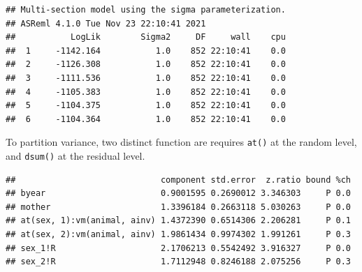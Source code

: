 \documentclass[
  12pt,
]{book}
\newenvironment{Shaded}{\begin{snugshade}}{\end{snugshade}}
\newcommand{\DataTypeTok}[1]{\textcolor[rgb]{0.13,0.29,0.53}{#1}}
\newcommand{\DecValTok}[1]{\textcolor[rgb]{0.00,0.00,0.81}{#1}}
\newcommand{\KeywordTok}[1]{\textcolor[rgb]{0.13,0.29,0.53}{\textbf{#1}}}
\newcommand{\NormalTok}[1]{#1}
\newcommand{\OperatorTok}[1]{\textcolor[rgb]{0.81,0.36,0.00}{\textbf{#1}}}
\newcommand{\StringTok}[1]{\textcolor[rgb]{0.31,0.60,0.02}{#1}}
\begin{document}
\begin{Shaded}
\end{Shaded}

\begin{verbatim}
## Multi-section model using the sigma parameterization.
## ASReml 4.1.0 Tue Nov 23 22:10:41 2021
##           LogLik        Sigma2     DF     wall    cpu
##  1     -1142.164           1.0    852 22:10:41    0.0
##  2     -1126.308           1.0    852 22:10:41    0.0
##  3     -1111.536           1.0    852 22:10:41    0.0
##  4     -1105.383           1.0    852 22:10:41    0.0
##  5     -1104.375           1.0    852 22:10:41    0.0
##  6     -1104.364           1.0    852 22:10:41    0.0
\end{verbatim}

To partition variance, two distinct function are requires \texttt{at()} at the random level, and \texttt{dsum()} at the residual level.

\begin{Shaded}
\end{Shaded}

\begin{verbatim}
##                             component std.error  z.ratio bound %ch
## byear                       0.9001595 0.2690012 3.346303     P 0.0
## mother                      1.3396184 0.2663118 5.030263     P 0.0
## at(sex, 1):vm(animal, ainv) 1.4372390 0.6514306 2.206281     P 0.1
## at(sex, 2):vm(animal, ainv) 1.9861434 0.9974302 1.991261     P 0.3
## sex_1!R                     2.1706213 0.5542492 3.916327     P 0.0
## sex_2!R                     1.7112948 0.8246188 2.075256     P 0.3
\end{verbatim}
\end{document}

